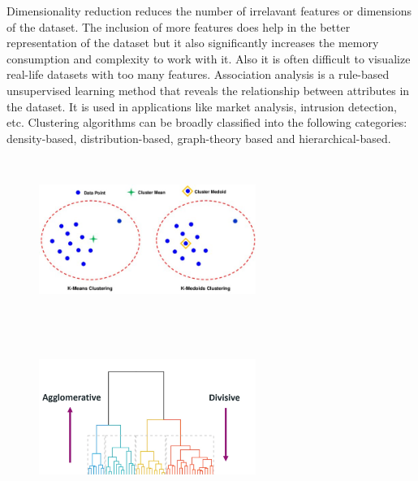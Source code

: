 \vspace{5mm}

Dimensionality reduction reduces the number of irrelavant features or dimensions of the dataset. The inclusion of more features does help in the better representation of the dataset but it also significantly increases the memory consumption and complexity to work with it. Also it is often difficult to visualize real-life datasets with too many features. Association analysis is a rule-based unsupervised learning method that reveals the relationship between attributes in the dataset. It is used in applications like market analysis, intrusion detection, etc. Clustering algorithms can be broadly classified into the following categories: density-based, distribution-based, graph-theory based and hierarchical-based.\\
\begin{figure}
  \centering
  \begin{minipage}[t]{.45\textwidth}
    \centering
    \includegraphics[width=200pt,height=150pt]{pictures/The-graphical-representation-of-the-difference-between-the-k-means-and-k-medoids_W640.jpg}
    \label{fig:kmean-kmedoid}
  \end{minipage}%
  \hspace{1cm}
  \begin{minipage}[t]{.45\textwidth}
    \centering
    \includegraphics[width=200pt,height=150pt]{pictures/dendogram.png}
    \label{fig:dendogram}
  \end{minipage}
\end{figure}
